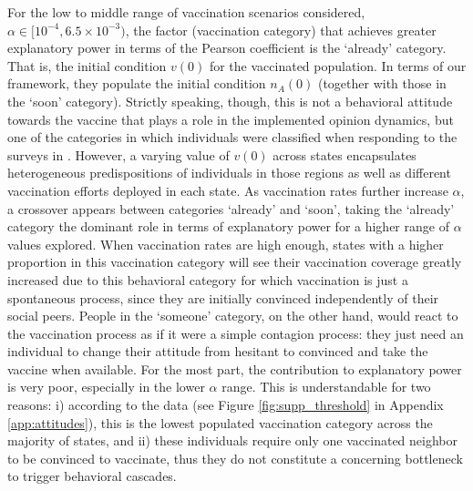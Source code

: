 \documentclass[
 reprint,
 amsmath,amssymb,
 aps,
]{revtex4-2}
\begin{document}
For the low to middle range of vaccination scenarios considered, $\alpha\in[10^{-4},6.5\times 10^{-3})$, the factor (vaccination category) that achieves greater explanatory power in terms of the Pearson coefficient is the `already' category. That is, the initial condition $v(0)$ for the vaccinated population. In terms of our framework, they populate the initial condition $n_A(0)$ (together with those in the `soon' category). Strictly speaking, though, this is not a behavioral attitude towards the vaccine that plays a role in the implemented opinion dynamics, but one of the categories in which individuals were classified when responding to the surveys in \cite{lazer2021covid}. However, a varying value of $v(0)$ across states encapsulates heterogeneous predispositions of individuals in those regions as well as different vaccination efforts deployed in each state. As vaccination rates further increase $\alpha$, a crossover appears between categories `already' and `soon', taking the `already' category the dominant role in terms of explanatory power for a higher range of $\alpha$ values explored. When vaccination rates are high enough, states with a higher proportion in this vaccination category will see their vaccination coverage greatly increased due to this behavioral category for which vaccination is just a spontaneous process, since they are initially convinced independently of their social peers. People in the `someone' category, on the other hand, would react to the vaccination process as if it were a simple contagion process: they just need an individual to change their attitude from hesitant to convinced and take the vaccine when available. For the most part, the contribution to explanatory power is very poor, especially in the lower $\alpha$ range. This is understandable for two reasons: i) according to the data (see Figure \ref{fig:supp_threshold} in Appendix \ref{app:attitudes}), this is the lowest populated vaccination category across the majority of states, and ii) these individuals require only one vaccinated neighbor to be convinced to vaccinate, thus they do not constitute a concerning bottleneck to trigger behavioral cascades. 
\end{document}
